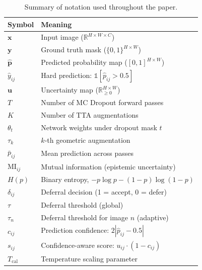 \begin{table}[H]
\centering
\caption{Summary of notation used throughout the paper.}
\label{tab:notation}
\scriptsize
\setlength{\tabcolsep}{3.5pt}
\renewcommand{\arraystretch}{1.05}
\begin{center}
\begin{tabular}{l l}
\toprule
\textbf{Symbol} & \textbf{Meaning} \\
\midrule
$\mathbf{x}$       & Input image ($\mathbb{R}^{H \times W \times C}$) \\
$\mathbf{y}$       & Ground truth mask ($\{0,1\}^{H \times W}$) \\
$\hat{\mathbf{p}}$ & Predicted probability map ($[0,1]^{H \times W}$) \\
$\hat{y}_{ij}$     & Hard prediction: $\mathbb{1}[\hat{p}_{ij} > 0.5]$ \\
$\mathbf{u}$       & Uncertainty map ($\mathbb{R}_{\geq 0}^{H \times W}$) \\
$T$                & Number of MC Dropout forward passes \\
$K$                & Number of TTA augmentations \\
$\theta_t$         & Network weights under dropout mask $t$ \\
$\tau_k$           & $k$-th geometric augmentation \\
$\bar{p}_{ij}$     & Mean prediction across passes \\
$\mathrm{MI}_{ij}$ & Mutual information (epistemic uncertainty) \\
$H(p)$             & Binary entropy, $-p\log p - (1-p)\log(1-p)$ \\
$\delta_{ij}$      & Deferral decision (1 = accept, 0 = defer) \\
$\tau$             & Deferral threshold (global) \\
$\tau_n$           & Deferral threshold for image $n$ (adaptive) \\
$c_{ij}$           & Prediction confidence: $2|\hat{p}_{ij} - 0.5|$ \\
$s_{ij}$           & Confidence-aware score: $u_{ij} \cdot (1 - c_{ij})$ \\
$T_{\mathrm{cal}}$ & Temperature scaling parameter \\
\bottomrule
\end{tabular}
\end{center}
\end{table}
